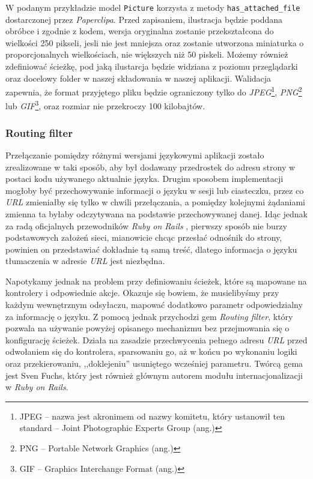 \documentclass[a4paper,12pt]{article}
\begin{document}
W podanym przykładzie model \texttt{Picture} korzysta z metody \texttt{has\_attached\_file}
dostarczonej przez \emph{Paperclipa}. Przed zapisaniem, ilustracja będzie poddana obróbce
i zgodnie z kodem, wersja oryginalna zostanie przekształcona do wielkości 250 pikseli,
jesli nie jest mniejsza oraz zostanie utworzona miniaturka o proporcjonalnych
wielkościach, nie większych niż 50 piskeli. Możemy również zdefiniować ścieżkę, pod jaką
ilustarcja będzie widziana z poziomu przeglądarki oraz docelowy folder w naszej
składowania w naszej aplikacji. Walidacja zapewnia, że format przyjętego pliku będzie
ograniczony tylko do \emph{JPEG}\footnote{JPEG -- nazwa jest akronimem od nazwy komitetu,
który ustanowił ten standard -- Joint Photographic Experts Group (ang.)},
\emph{PNG}\footnote{PNG -- Portable Network Graphics (ang.)} lub \emph{GIF}\footnote{GIF --
Graphics Interchange Format (ang.)}, oraz rozmiar nie przekroczy 100 kilobajtów.

\subsubsection{Routing filter}
Przełączanie pomiędzy różnymi wersjami językowymi aplikacji zostało zrealizowane w taki
sposób, aby był dodawany przedrostek do adresu strony w postaci kodu używanego aktualnie
języka. Drugim sposobem implementacji mogłoby być przechowywanie informacji o języku w sesji
lub ciasteczku, przez co \emph{URL} zmieniałby się tylko w chwili przełączania, a pomiędzy
kolejnymi żądaniami zmienna ta byłaby odczytywana na podstawie przechowywanej danej.
Idąc jednak za radą oficjalnych przewodników \emph{Ruby on Rails} \cite{rails-guides},
pierwszy sposób nie burzy podstawowych założeń sieci, mianowicie chcąc przesłać odnośnik
do strony, powinien on przedstawiać dokładnie tą samą treść, dlatego informacja o języku
tłumaczenia w adresie \emph{URL} jest niezbędna.


Napotykamy jednak na problem przy definiowaniu ścieżek, które są mapowane na kontrolery i
odpowiednie akcje. Okazuje się bowiem, że musielibyśmy przy każdym wewnętrznym odsyłaczu,
mapować dodatkowo parametr odpowiedzialny za informację o języku. Z pomocą jednak
przychodzi gem \emph{Routing filter}, który pozwala na używanie powyżej opisanego
mechanizmu bez przejmowania się o konfigurację ścieżek. Działa na zasadzie przechwycenia
pełnego adresu \emph{URL} przed odwołaniem się do kontrolera, sparsowaniu go, aż w końcu
po wykonaniu logiki oraz przekierowaniu, ,,doklejeniu'' usuniętego wcześniej parametru.
Twórcą gema jest Sven Fuchs, który jest również głównym autorem modułu internacjonalizacji
w \emph{Ruby on Rails}.
\end{document}
